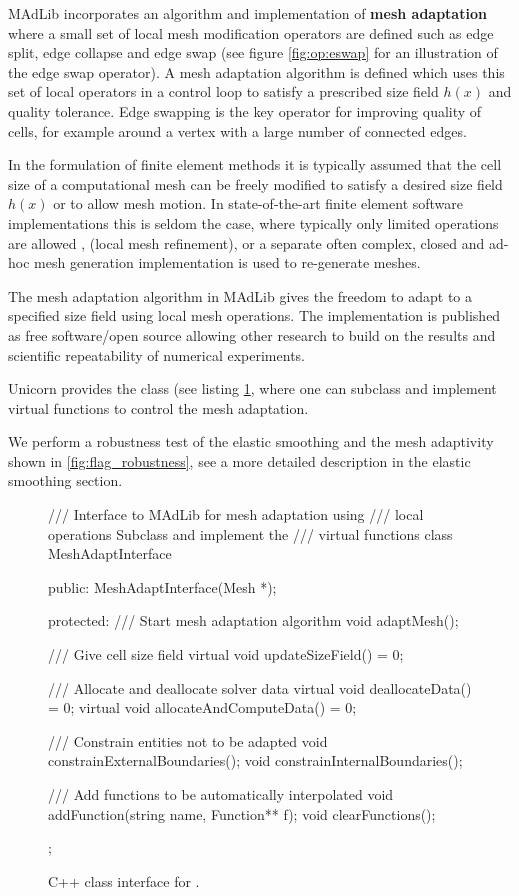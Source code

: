 
MAdLib incorporates an algorithm and implementation of {\bf mesh
adaptation} where a small set of local mesh modification operators are
defined such as edge split, edge collapse and edge swap (see
figure \ref{fig:op:eswap} for an illustration of the edge swap
operator). A mesh adaptation algorithm is defined which uses this set
of local operators in a control loop to satisfy a prescribed size
field $h(x)$ and quality tolerance. Edge swapping is the key operator
for improving quality of cells, for example around a vertex with a
large number of connected edges.

In the formulation of finite element methods it is typically assumed
that the cell size of a computational mesh can be freely modified
to satisfy a desired size field $h(x)$ or to allow mesh motion. In
state-of-the-art finite element software implementations this
is seldom the case, where typically only limited operations are
allowed \citep{BangerthHartmannKanschat2007, COMSOL2009}, (local
mesh refinement), or a separate often complex, closed and ad-hoc mesh
generation implementation is used to re-generate meshes.

The mesh adaptation algorithm in MAdLib gives the freedom to adapt to a
specified size field using local mesh operations. The implementation is
published as free software/open source allowing other research to build
on the results and scientific repeatability of numerical experiments.

Unicorn provides the  class (see listing
\ref{code:MeshAdaptInterface}, where one can subclass and implement
virtual functions to control the mesh adaptation.

We perform a robustness test of the elastic smoothing and the mesh
adaptivity shown in \ref{fig:flag_robustness}, see a more detailed
description in the elastic smoothing section.

\begin{figure}
\begin{c++}
/// Interface to MAdLib for mesh adaptation using
/// local operations Subclass and implement the
/// virtual functions
class MeshAdaptInterface
{
public:
  MeshAdaptInterface(Mesh *);

protected:
  /// Start mesh adaptation algorithm
  void adaptMesh();

  /// Give cell size field
  virtual void updateSizeField() = 0;

  /// Allocate and deallocate solver data
  virtual void deallocateData() = 0;
  virtual void allocateAndComputeData() = 0;

  /// Constrain entities not to be adapted
  void constrainExternalBoundaries();
  void constrainInternalBoundaries();

  /// Add functions to be automatically interpolated
  void addFunction(string name, Function** f);
  void clearFunctions();
};
\end{c++}
\caption{C++ class interface for .}
\label{code:MeshAdaptInterface}
\end{figure}




